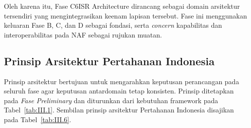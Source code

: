 Oleh karena itu, Fase C6ISR Architecture dirancang sebagai domain arsitektur tersendiri yang mengintegrasikan keenam lapisan tersebut. Fase ini menggunakan keluaran Fase B, C, dan D sebagai fondasi, serta \textit{concern} kapabilitas dan interoperabilitas pada NAF sebagai rujukan muatan.

\subsection{Prinsip Arsitektur Pertahanan Indonesia}
\label{sec:III.2.3}

Prinsip arsitektur bertujuan untuk mengarahkan keputusan perancangan pada seluruh fase agar keputusan antardomain tetap konsisten. Prinsip ditetapkan pada \textit{Fase Preliminary} dan diturunkan dari kebutuhan framework pada Tabel~\ref{tab:III.1}. Sembilan prinsip arsitektur Pertahanan Indonesia disajikan pada Tabel~\ref{tab:III.6}.

